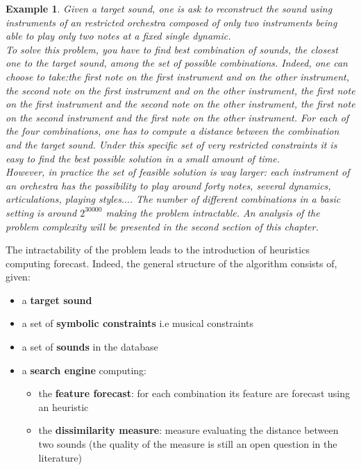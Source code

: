 \documentclass[a4paper]{book}
\newtheorem{ex}{Example}[chapter]
\begin{document}
\begin{ex}
Given a target sound, one is ask to reconstruct the sound using instruments of an restricted orchestra composed of only two instruments being able to play only two notes at a fixed single dynamic. \\
To solve this problem, you have to find best combination of sounds, the closest one to the target sound, among the set of possible combinations. Indeed, one can choose to take:the first note on the first instrument and on the other instrument, the second note on the first instrument and on the other instrument, the first note on the first instrument and the second note on the other instrument, the first note on the second instrument and the first note on the other instrument.
For each of the four combinations, one has to compute a distance between the combination and the target sound. Under this specific set of very restricted constraints it is easy to find the best possible solution in a small amount of time. \\

However, in practice the set of feasible solution is way larger: each instrument of an orchestra has the possibility to play around forty notes, several dynamics, articulations, playing styles$\ldots$. The number of different combinations in a basic setting is around $2^{30000}$ making the problem intractable. An analysis of the problem complexity will be presented in the second section of this chapter.\\

\end{ex}
The intractability of the problem leads to the introduction of heuristics computing forecast. 
Indeed, the general structure of the algorithm consists of, given:
\begin{itemize}
    \item a \textbf{target sound}
    \item a set of \textbf{symbolic constraints} i.e musical constraints
    \item a set of \textbf{sounds} in the database
    \item a \textbf{search engine} computing:
    \begin{itemize}
        \item the \textbf{feature forecast}: for each combination its feature are forecast using an heuristic
        \item the \textbf{dissimilarity measure}: measure evaluating the distance between two sounds (the quality of the measure is still an open question in the literature) 
    \end{itemize}
\end{itemize}
\end{document}
